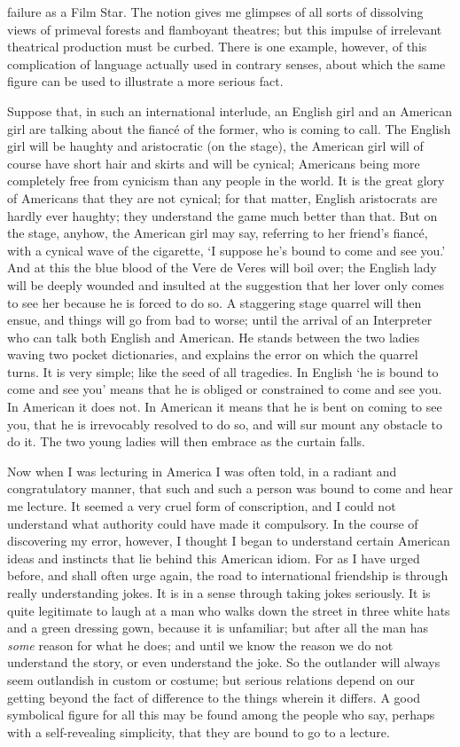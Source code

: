 \documentclass{book}
\begin{document}
failure as a Film Star. The notion gives me glimpses of all sorts of dissolving views of primeval forests and flamboyant theatres; but this impulse of irrelevant theatrical production must be curbed. There is one example, however, of this complication of language actually used in contrary senses, about which the same figure can be used to illustrate a more serious fact.

Suppose that, in such an international interlude, an English girl and an American girl are talking about the fiancé of the former, who is coming to call. The English girl will be haughty and aristocratic (on the stage), the American girl will of course have short hair and skirts and will be cynical; Americans being more completely free from cynicism than any people in the world. It is the great glory of Americans that they are not cynical; for that matter, English aristocrats are hardly ever haughty; they understand the game much better than that. But on the stage, anyhow, the American girl may say, referring to her friend’s fiancé, with a cynical wave of the cigarette, ‘I suppose he’s bound to come and see you.’ And at this the blue blood of the Vere de Veres will boil over; the English lady will be deeply wounded and insulted at the suggestion that her lover only comes to see her because he is forced to do so. A staggering stage quarrel will then ensue, and things will go from bad to worse; until the arrival of an Interpreter who can talk both English and American. He stands between the two ladies waving two pocket dictionaries, and explains the error on which the quarrel turns. It is very simple; like the seed of all tragedies. In English ‘he is bound to come and see you’ means that he is obliged or constrained to come and see you. In American it does not. In American it means that he is bent on coming to see you, that he is irrevocably resolved to do so, and will sur mount any obstacle to do it. The two young ladies will then embrace as the curtain falls.

Now when I was lecturing in America I was often told, in a radiant and congratulatory manner, that such and such a person was bound to come and hear me lecture. It seemed a very cruel form of conscription, and I could not understand what authority could have made it compulsory. In the course of discovering my error, however, I thought I began to understand certain American ideas and instincts that lie behind this American idiom. For as I have urged before, and shall often urge again, the road to international friendship is through really understanding jokes. It is in a sense through taking jokes seriously. It is quite legitimate to laugh at a man who walks down the street in three white hats and a green dressing gown, because it is unfamiliar; but after all the man has \emph{some} reason for what he does; and until we know the reason we do not understand the story, or even understand the joke. So the outlander will always seem outlandish in custom or costume; but serious relations depend on our getting beyond the fact of difference to the things wherein it differs. A good symbolical figure for all this may be found among the people who say, perhaps with a self-revealing simplicity, that they are bound to go to a lecture.
\end{document}
